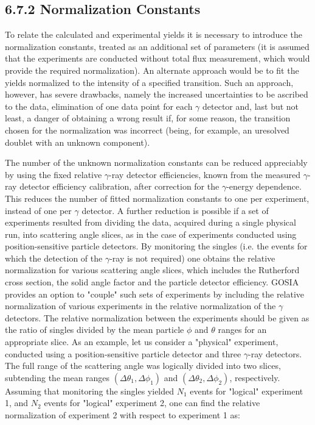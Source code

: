 \documentclass[10pt]{article}
\begin{document}
\subsection*{6.7.2 Normalization Constants}
To relate the calculated and experimental yields it is necessary to introduce the normalization constants, treated as an additional set of parameters (it is assumed that the experiments are conducted without total flux measurement, which would provide the required normalization). An alternate approach would be to fit the yields normalized to the intensity of a specified transition. Such an approach, however, has severe drawbacks, namely the increased uncertainties to be ascribed to the data, elimination of one data point for each $\gamma$ detector and, last but not least, a danger of obtaining a wrong result if, for some reason, the transition chosen for the normalization was incorrect (being, for example, an uresolved doublet with an unknown component).

The number of the unknown normalization constants can be reduced appreciably by using the fixed relative $\gamma$-ray detector efficiencies, known from the measured $\gamma$-ray detector efficiency calibration, after correction for the $\gamma$-energy dependence. This reduces the number of fitted normalization constants to one per experiment, instead of one per $\gamma$ detector. A further reduction is possible if a set of experiments resulted from dividing the data, acquired during a single physical run, into scattering angle slices, as in the case of experiments conducted using position-sensitive particle detectors. By monitoring the singles (i.e. the events for which the detection of the $\gamma$-ray is not required) one obtains the relative normalization for various scattering angle slices, which includes the Rutherford cross section, the solid angle factor and the particle detector efficiency. GOSIA provides an option to "couple" such sets of experiments by including the relative normalization of various experiments in the relative normalization of the $\gamma$ detectors. The relative normalization between the experiments should be given as the ratio of singles divided by the mean particle $\phi$ and $\theta$ ranges for an appropriate slice. As an example, let us consider a "physical" experiment, conducted using a position-sensitive particle detector and three $\gamma$-ray detectors. The full range of the scattering angle was logically divided into two slices, subtending the mean ranges $\left(\Delta \theta_{1}, \Delta \phi_{1}\right)$ and $\left(\Delta \theta_{2}, \Delta \phi_{2}\right)$, respectively. Assuming that monitoring the singles yielded $N_{1}$ events for "logical" experiment 1, and $N_{2}$ events for "logical" experiment 2, one can find the relative normalization of experiment 2 with respect to experiment 1 as:
\end{document}
